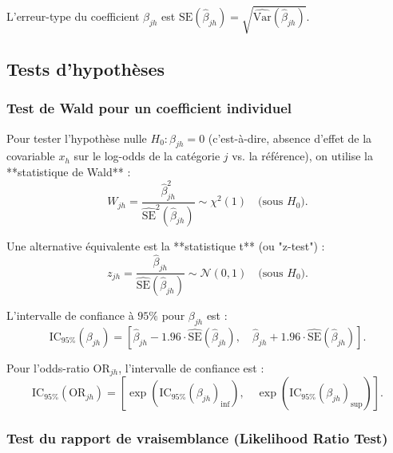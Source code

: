 \documentclass[12pt,a4paper]{article}
\begin{document}
L'erreur-type du coefficient $\widehat{\beta}_{jh}$ est $\text{SE}(\widehat{\beta}_{jh}) = \sqrt{\widehat{\text{Var}}(\widehat{\beta}_{jh})}$.

\subsection{Tests d'hypothèses}

\subsubsection{Test de Wald pour un coefficient individuel}

Pour tester l'hypothèse nulle $H_0 : \beta_{jh} = 0$ (c'est-à-dire, absence d'effet de la covariable $x_h$ sur le log-odds de la catégorie $j$ vs. la référence), on utilise la **statistique de Wald** :
\begin{equation}\label{eq:wald}
W_{jh} = \frac{\widehat{\beta}_{jh}^2}{\widehat{\text{SE}}^2(\widehat{\beta}_{jh})} \sim \chi^2(1) \quad \text{(sous } H_0\text{)}.
\end{equation}

Une alternative équivalente est la **statistique t** (ou "z-test") :
\begin{equation}
z_{jh} = \frac{\widehat{\beta}_{jh}}{\widehat{\text{SE}}(\widehat{\beta}_{jh})} \sim \mathcal{N}(0,1) \quad \text{(sous } H_0\text{)}.
\end{equation}

L'intervalle de confiance à $95\%$ pour $\beta_{jh}$ est :
\begin{equation}
\text{IC}_{95\%}(\beta_{jh}) = \left[ \widehat{\beta}_{jh} - 1.96 \cdot \widehat{\text{SE}}(\widehat{\beta}_{jh}), \quad \widehat{\beta}_{jh} + 1.96 \cdot \widehat{\text{SE}}(\widehat{\beta}_{jh}) \right].
\end{equation}

Pour l'odds-ratio $\text{OR}_{jh}$, l'intervalle de confiance est :
\begin{equation}
\text{IC}_{95\%}(\text{OR}_{jh}) = \left[ \exp(\text{IC}_{95\%}(\beta_{jh})_\text{inf}), \quad \exp(\text{IC}_{95\%}(\beta_{jh})_\text{sup}) \right].
\end{equation}

\subsubsection{Test du rapport de vraisemblance (Likelihood Ratio Test)}
\end{document}
